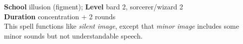 \textbf{School} illusion (figment); \textbf{Level} bard 2, sorcerer/wizard 2\\
\textbf{Duration} concentration + 2 rounds\\
This spell functions like \textit{silent image}, except that \textit{minor image }includes some minor sounds but not understandable speech.\\
